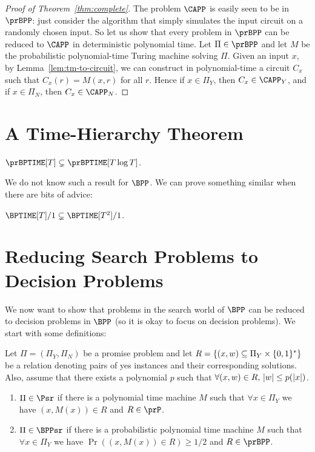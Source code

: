 \begin{proof}[Proof of Theorem~\ref{thm:complete}]
  The problem $\CAPP$ is easily seen to be in $\prBPP$: just consider the
  algorithm that simply simulates the input circuit on a randomly chosen input.
  So let us show that every problem in $\prBPP$ can be reduced to $\CAPP$ in
  deterministic polynomial time. Let $\Pi \in \prBPP$ and let $M$ be the
  probabilistic polynomial-time Turing machine solving $\Pi$. Given an input
  $x$, by Lemma~\ref{lem:tm-to-circuit}, we can construct in polynomial-time a
  circuit $C_x$ such that $C_x(r) = M(x, r)$ for all $r$. Hence if $x \in
  \Pi_Y$, then $C_x \in \CAPP_Y$, and if $x \in \Pi_N$, then $C_x \in \CAPP_N$.
\end{proof}

\section{A Time-Hierarchy Theorem}

\begin{theorem}
  $\prBPTIME[T] \subsetneq \prBPTIME[T \log T]$.
\end{theorem}


We do not know such a result for $\BPP$. We can prove something similar when there are bits of advice:

\begin{proposition}
	$\BPTIME[T]/1 \subsetneq \BPTIME[T^2]/1$.
\end{proposition}


\section{Reducing Search Problems to Decision Problems}

We now want to show that problems in the search world of $\BPP$ can be reduced to decision problems in $\BPP$ (so it is okay to focus on decision problems). We start with some definitions:

\begin{definition}
	Let $\Pi = (\Pi_Y,\Pi_N)$ be a promise problem and let $R=\{ (x,w) \subseteq \Pi_Y \times \{0,1\}^* \}$ be a relation denoting pairs of yes instances and their corresponding solutions. Also, assume that there exists a polynomial $p$ such that $\forall (x,w) \in R, \, \lvert w\rvert \leq p(\lvert x\rvert)$.
	
	\begin{enumerate}
		\item $\Pi \in \Psr$ if there is a polynomial time machine $M$ such that $\forall x \in \Pi_Y$ we have $(x, M(x)) \in R$ and $R \in \prP$.
		\item $\Pi \in \BPPsr$ if there is a probabilistic polynomial time machine $M$ such that $\forall x \in \Pi_Y$ we have $\Pr( (x, M(x)) \in R) \geq 1/2$ and $R \in \prBPP$.		
	\end{enumerate}
\end{definition}

